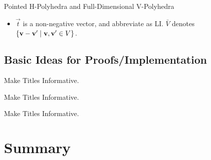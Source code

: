 \documentclass{beamer}
\begin{document}
\begin{frame}{Pointed H-Polyhedra and Full-Dimensional V-Polyhedra}
\begin{itemize}
  \item $\vec{t}$ is a non-negative vector, and abbreviate {\LI} as LI. $\bar V$ denotes $\{\mathbf{v}-\mathbf{v}'\;|\;\mathbf{v},\mathbf{v}'\in V\}$.\\

  \renewcommand{\arraystretch}{1.3}
\end{itemize}
\end{frame}

\subsection{Basic Ideas for Proofs/Implementation}

\begin{frame}{Make Titles Informative.}
\end{frame}

\begin{frame}{Make Titles Informative.}
\end{frame}

\begin{frame}{Make Titles Informative.}
\end{frame}


\section*{Summary}
\end{document}
